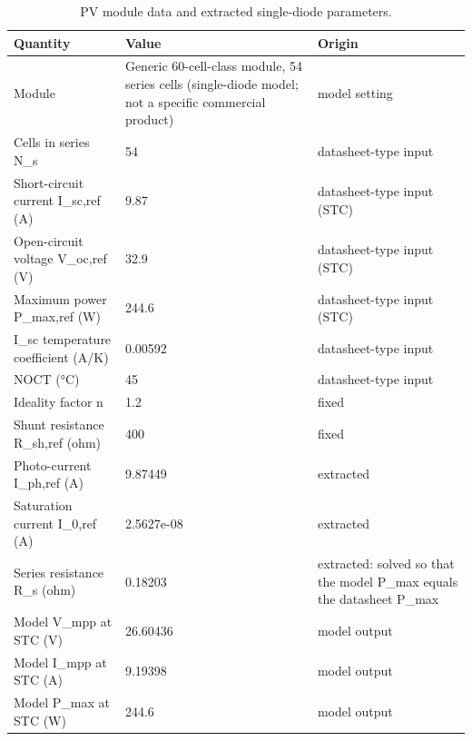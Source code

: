\begin{table}[t]
\centering
\caption{PV module data and extracted single-diode parameters.}
\label{tab:Table_PV_Datasheet}
\small
\begin{tabular}{lll}
\hline
Quantity & Value & Origin \\
\hline
Module & Generic 60-cell-class module, 54 series cells (single-diode model; not a specific commercial product) & model setting \\
Cells in series N\_s & 54 & datasheet-type input \\
Short-circuit current I\_sc,ref (A) & 9.87 & datasheet-type input (STC) \\
Open-circuit voltage V\_oc,ref (V) & 32.9 & datasheet-type input (STC) \\
Maximum power P\_max,ref (W) & 244.6 & datasheet-type input (STC) \\
I\_sc temperature coefficient (A/K) & 0.00592 & datasheet-type input \\
NOCT (°C) & 45 & datasheet-type input \\
Ideality factor n & 1.2 & fixed \\
Shunt resistance R\_sh,ref (ohm) & 400 & fixed \\
Photo-current I\_ph,ref (A) & 9.87449 & extracted \\
Saturation current I\_0,ref (A) & 2.5627e-08 & extracted \\
Series resistance R\_s (ohm) & 0.18203 & extracted: solved so that the model P\_max equals the datasheet P\_max \\
Model V\_mpp at STC (V) & 26.60436 & model output \\
Model I\_mpp at STC (A) & 9.19398 & model output \\
Model P\_max at STC (W) & 244.6 & model output \\
\hline
\end{tabular}
\end{table}
